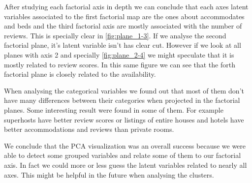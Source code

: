 After studying each factorial axis in depth we can conclude that each axes
latent variables associated to the first factorial map are the ones about accommodates and beds and the third factorial axis are mostly associated with 
the number of reviews. This is specially clear in \cref{fig:plane_1-3}. If we analyse the second factorial plane, it's latent variable isn't has clear cut.
However if we look at all planes with axis 2 and specially \cref{fig:plane_2-4}
we might speculate that it is mostly related to review scores. In this same figure we can see that the forth factorial plane is closely related to the availability.

When analysing the categorical variables we found out that most of them don't have many differences between their categories when projected in the factorial planes. Some interesting result were found in some of them. For example superhosts have better review scores or listings of entire houses and hotels have better accommodations and reviews than private rooms.

We conclude that the PCA visualization was an overall success because we were able to detect some grouped variables and relate some of them to our factorial axis. In fact we could more or less guess the latent variables related to
nearly all axes. This might be helpful in the future when analysing the clusters.








